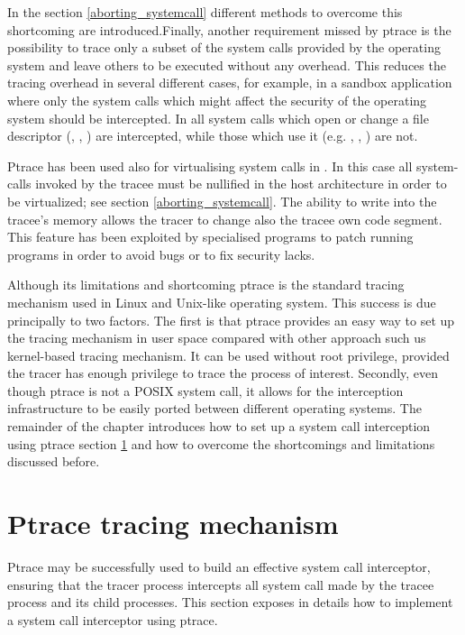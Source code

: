 In the section \ref{aborting_systemcall} different methods to overcome this shortcoming are introduced.Finally, another requirement missed by ptrace is the possibility to trace only a subset of the system calls provided by the operating system and leave others to be executed without any overhead. This reduces the tracing overhead in several different cases, for example, in a sandbox application  where only the system calls which might affect the security of the operating system should be intercepted. In \cite{Noordende_asecure} all system calls which open or change a file descriptor (, , ) are intercepted, while those which use it (e.g. , , ) are not. 


Ptrace has been used also for virtualising system calls in \cite{UML_1,goanna, UML_2}. In this case all system-calls invoked by the tracee must be nullified in the host architecture in order to be virtualized; see section \ref{aborting_systemcall}. The ability to write into the tracee's memory allows the tracer to change also the tracee own code segment. This feature has been exploited by specialised programs to patch running programs in order to avoid  bugs or to fix security lacks. 

Although its limitations and shortcoming ptrace is the standard tracing mechanism used in Linux and Unix-like operating system. This success is due principally to two factors. 
The first is that ptrace provides an easy way to set up the tracing mechanism in user space compared with other approach such us kernel-based tracing mechanism. It can be used without root privilege, provided the tracer has enough privilege to trace the process of interest. Secondly, even though ptrace is not a POSIX system call, it allows for the interception infrastructure to be easily ported between different operating systems.  The remainder of the chapter introduces how to set up a system call interception using ptrace section \ref{Ptrace_tracing_mechanism} and how to overcome the shortcomings and limitations discussed before. 


\section{Ptrace tracing mechanism}
\label{Ptrace_tracing_mechanism}

Ptrace may be successfully used to build an effective system call interceptor, ensuring that the tracer process intercepts all system call made by the tracee process and its child processes. This section exposes in details how to implement a system call interceptor using ptrace. 

